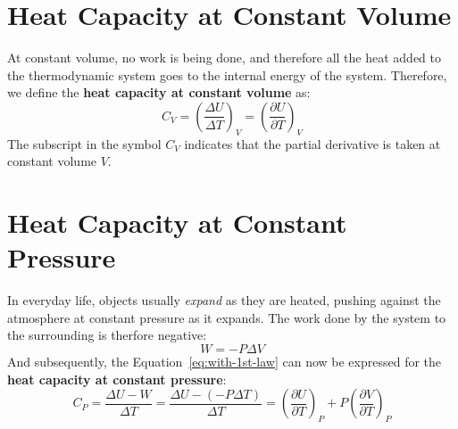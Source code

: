 \documentclass[11pt]{article}
\begin{document}
\section{Heat Capacity at Constant Volume}

At constant volume, no work is being done, and therefore all the heat added
to the thermodynamic system goes to the internal energy of the system.
Therefore, we define the \textbf{heat capacity at constant volume} as:
\begin{equation}
  C_V
  =\left(\frac{\Delta   U}{\Delta T}\right)_V
  =\left(\frac{\partial U}{\partial T}\right)_V
\end{equation}
The subscript in the symbol $C_V$ indicates that the partial derivative is taken
at constant volume $V$.

\section{Heat Capacity at Constant Pressure}

In everyday life, objects usually \emph{expand} as they are heated, pushing
against the atmosphere at constant pressure as it expands. The work done by
the system to the surrounding is therfore negative:
\begin{equation}
  W=-P\Delta V
\end{equation}
And subsequently, the Equation~\ref{eq:with-1st-law} can now be expressed for
the \textbf{heat capacity at constant pressure}:
\begin{equation}
  C_P=\frac{\Delta U-W}{\Delta T}=
  \frac{\Delta U-(-P\Delta T)}{\Delta T}=
  \boxed{\left(\frac{\partial U}{\partial T}\right)_P+
  P\left(\frac{\partial V}{\partial T}\right)_P}
\end{equation}
\end{document}
